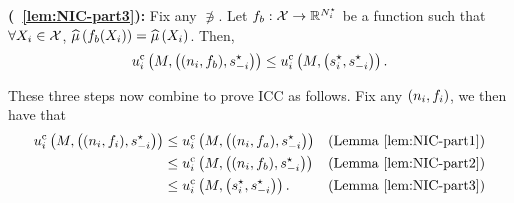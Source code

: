 \textbf{(~\ref{lem:NIC-part3}):}
Fix any $\nni$. Let $f_b:\mathcal{X}\rightarrow\mathbb{R}^{N^\star_i}$ be a function such that
$\forall X_{i}\in\mathcal{X}$, $\widehat{\mu}\left(f_b(X_{i})\right)=\widehat{\mu}\left(X_{i}\right)$.
Then,
\begin{align*}
    u^{\rm c}_{i} \left(M, \left((n_i,f_b),s_{-i}^{\star} \right)\right)
    \leq
    u^{\rm c}_{i} \left(M, \left(s_{i}^{\star},s_{-i}^{\star} \right)\right) .
\end{align*}

These three steps now combine to prove ICC as follows. Fix any $(n_i,f_i)$,
    we then have that
    \begin{align*}
        \utilci \rbr{M, \rbr{(\nni,\subfunci),\strat_{-i}^{\star} }}
        &\leq
        \utilci \rbr{M, \rbr{(\nni,f_a),\strat_{-i}^{\star} }}
        &
        (\text{Lemma}~\ref{lem:NIC-part1})
        \\
        &\leq
        \utilci \rbr{M, \rbr{(\nni,f_b),\strat_{-i}^{\star} }}
        &
        (\text{Lemma}~\ref{lem:NIC-part2})
        \\
        &\leq
        \utilci \rbr{M, \rbr{\strat_{i}^{\star},\strat_{-i}^{\star} }} .
        &
        \hspace{-1cm}
        (\text{Lemma}~\ref{lem:NIC-part3})
    \end{align*}



